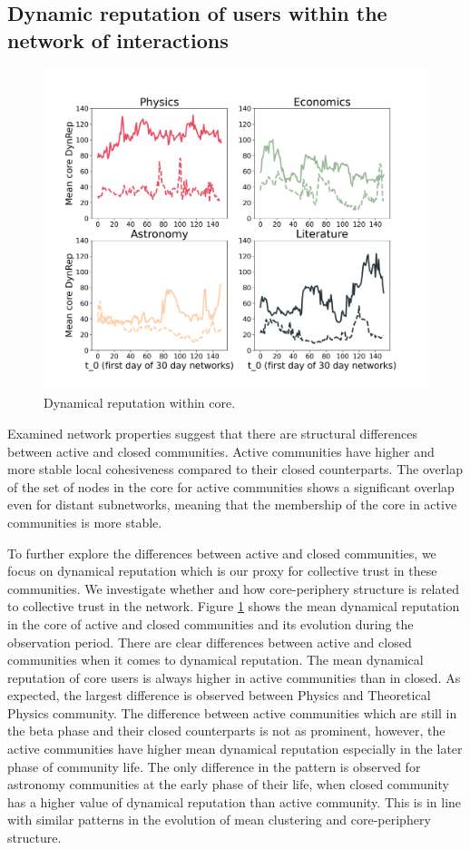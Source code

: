 \subsection{Dynamic reputation of users within the network of interactions}

\begin{figure}
	\centering
	\includegraphics[width=0.5\linewidth]{Figures/core_dr_test.png}
	\caption{Dynamical reputation within core.}
	\label{fig:dr_core}
\end{figure}

Examined network properties suggest that there are structural differences between active and closed communities. Active communities have higher and more stable local cohesiveness compared to their closed counterparts. The overlap of the set of nodes in the core for active communities shows a significant overlap even for distant subnetworks, meaning that the membership of the core in active communities is more stable.

To further explore the differences between active and closed communities, we focus on dynamical reputation which is our proxy for collective trust in these communities. We investigate whether and how core-periphery structure is related to collective trust in the network. Figure \ref{fig:dr_core} shows the mean dynamical reputation in the core of active and closed communities and its evolution during the observation period. There are clear differences between active and closed communities when it comes to dynamical reputation. The mean dynamical reputation of core users is always higher in active communities than in closed. As expected, the largest difference is observed between Physics and Theoretical Physics community. The difference between active communities which are still in the beta phase and their closed counterparts is not as prominent, however, the active communities have higher mean dynamical reputation especially in the later phase of community life. The only difference in the pattern is observed for astronomy communities at the early phase of their life, when closed community has a higher value of dynamical reputation than active community. This is in line with similar patterns in the evolution of mean clustering and core-periphery structure. 

